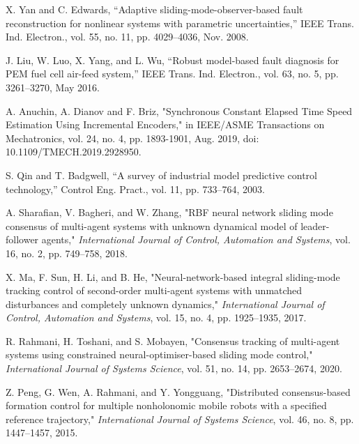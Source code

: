 \documentclass[journal,onecolumn]{IEEEtran}
\begin{document}
\begin{thebibliography}{99}
    X. Yan and C. Edwards, “Adaptive sliding-mode-observer-based fault
    reconstruction for nonlinear systems with parametric uncertainties,” IEEE
    Trans. Ind. Electron., vol. 55, no. 11, pp. 4029–4036, Nov. 2008.

    J. Liu, W. Luo, X. Yang, and L. Wu, “Robust model-based fault diagnosis
    for PEM fuel cell air-feed system,” IEEE Trans. Ind. Electron., vol. 63,
    no. 5, pp. 3261–3270, May 2016.

    A. Anuchin, A. Dianov and F. Briz, "Synchronous Constant Elapsed Time Speed Estimation Using Incremental Encoders," in IEEE/ASME Transactions on Mechatronics, vol. 24, no. 4, pp. 1893-1901, Aug. 2019, doi: 10.1109/TMECH.2019.2928950.

    S. Qin and T. Badgwell, “A survey of industrial model predictive control
    technology,” Control Eng. Pract., vol. 11, pp. 733–764, 2003.

    A. Sharafian, V. Bagheri, and W. Zhang, "RBF neural network sliding mode consensus of multi-agent systems with unknown dynamical model of leader-follower agents," \textit{International Journal of Control, Automation and Systems}, vol. 16, no. 2, pp. 749–758, 2018.

    X. Ma, F. Sun, H. Li, and B. He, "Neural-network-based integral sliding-mode tracking control of second-order multi-agent systems with unmatched disturbances and completely unknown dynamics," \textit{International Journal of Control, Automation and Systems}, vol. 15, no. 4, pp. 1925–1935, 2017.
    

    R. Rahmani, H. Toshani, and S. Mobayen, "Consensus tracking of multi-agent systems using constrained neural-optimiser-based sliding mode control," \textit{International Journal of Systems Science}, vol. 51, no. 14, pp. 2653–2674, 2020.

    Z. Peng, G. Wen, A. Rahmani, and Y. Yongguang, "Distributed consensus-based formation control for multiple nonholonomic mobile robots with a specified reference trajectory," \textit{International Journal of Systems Science}, vol. 46, no. 8, pp. 1447–1457, 2015.
    
    \end{thebibliography}
    
\end{document}
